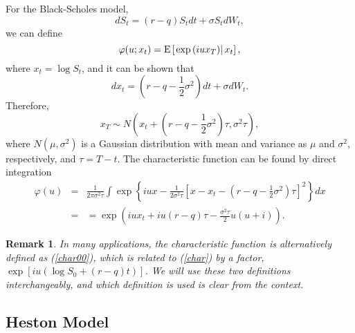 \documentclass[12pt]{article}
\newtheorem{remark}{Remark}
\begin{document}
    For the Black-Scholes model, 
    \begin{equation}
      dS_t=(r-q)S_tdt+\sigma S_tdW_t,
    \end{equation}
    we can define 
    \begin{equation}
      \varphi(u; x_t)={\rm E}\left[\left.\exp\left(iux_T\right)\right|x_t\right],
      \label{char00}
    \end{equation}
    where $x_t=\log S_t$, and it can be shown that
    \begin{equation}
      dx_t = \left(r-q-\frac{1}{2}\sigma^2\right) dt + \sigma dW_t.
    \end{equation}
    Therefore, 
    \begin{equation}
      x_T\sim N\left(x_t+\left(r-q-\frac{1}{2}\sigma^2\right)\tau, \sigma^2\tau\right),
    \end{equation}
    where $N(\mu,\sigma^2)$ is a Gaussian distribution with mean and variance
    as $\mu$ and $\sigma^2$, respectively, and $\tau=T-t$. The characteristic function can be found by direct integration
    \begin{eqnarray}
      \varphi(u)&=&\frac{1}{2\pi\sigma^2 \tau}\int \exp\left\{iux-\frac{1}{2\sigma^2\tau}
                      \left[x-x_t-\left(r-q-\frac{1}{2}\sigma^2\right)\tau\right]^2\right\}dx\nonumber\\
                &=&=\exp\left(iux_t + iu(r-q)\tau -\frac{\sigma^2\tau}{2}u(u+i)\right).
      \label{BS}
    \end{eqnarray}

    \begin{remark}
      In many applications, the characteristic function is alternatively defined as (\ref{char00}), which is related
      to (\ref{char}) by a factor, $\exp\left[iu(\log S_0 +(r-q)t)\right]$. We will use these two definitions interchangeably, and which 
      definition is used is clear from the context.
    \end{remark}

  \subsection{Heston Model}
\end{document}
